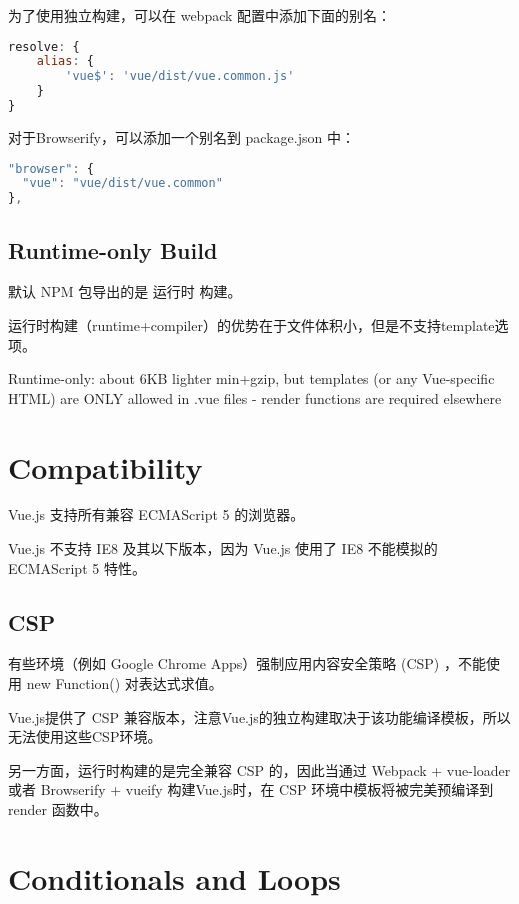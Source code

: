 为了使用独立构建，可以在 webpack 配置中添加下面的别名：

\begin{lstlisting}[language=JavaScript]
resolve: {
    alias: {
        'vue$': 'vue/dist/vue.common.js'
    }
}
\end{lstlisting}

对于Browserify，可以添加一个别名到 package.json 中：

\begin{lstlisting}[language=JavaScript]
"browser": {
  "vue": "vue/dist/vue.common"
},
\end{lstlisting}



\subsection{Runtime-only Build}


默认 NPM 包导出的是 运行时 构建。

运行时构建（runtime+compiler）的优势在于文件体积小，但是不支持template选项。

Runtime-only: about 6KB lighter min+gzip, but templates (or any Vue-specific HTML) are ONLY allowed in .vue files - render functions are required elsewhere 


\section{Compatibility}


 Vue.js 支持所有兼容 ECMAScript 5 的浏览器。
 
 Vue.js 不支持 IE8 及其以下版本，因为 Vue.js 使用了 IE8 不能模拟的 ECMAScript 5 特性。
 
 \subsection{CSP}
 
 
 有些环境（例如 Google Chrome Apps）强制应用内容安全策略 (CSP) ，不能使用 new Function() 对表达式求值。
 
Vue.js提供了 CSP 兼容版本，注意Vue.js的独立构建取决于该功能编译模板，所以无法使用这些CSP环境。

另一方面，运行时构建的是完全兼容 CSP 的，因此当通过 Webpack + vue-loader 或者 Browserify + vueify 构建Vue.js时，在 CSP 环境中模板将被完美预编译到 render 函数中。


 


\section{Conditionals and Loops}

